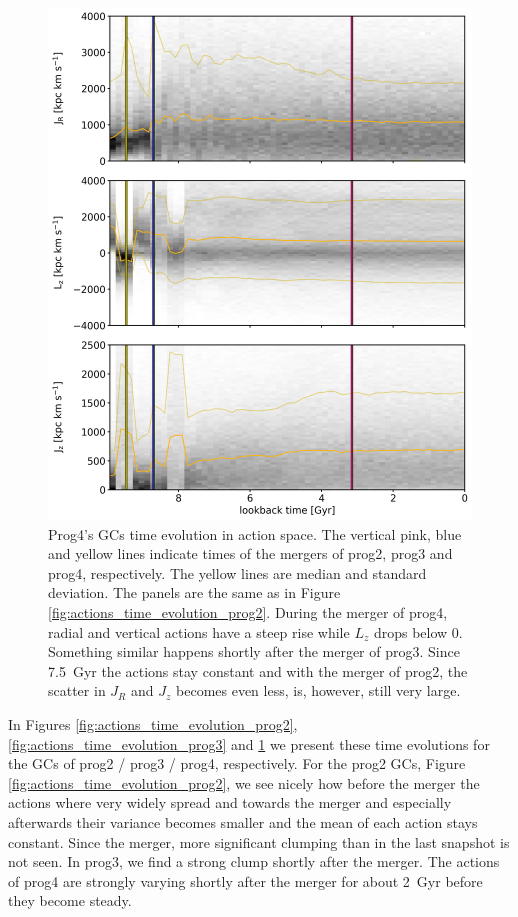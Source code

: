 \begin{figure}[htbp]
\captionsetup{format=plain}
    \centering
	\includegraphics[width=\textwidth]{plots/Dynamics/prog4/action_time_evolution_wodisk_hist_mean.png}
    \caption{Prog4's \acp{GC} time evolution in action space. The vertical pink, blue and yellow lines indicate times of the mergers of prog2, prog3 and prog4, respectively. The yellow lines are median and standard deviation. The panels are the same as in Figure \ref{fig:actions_time_evolution_prog2}. During the merger of prog4, radial and vertical actions have a steep rise while $L_z$ drops below 0. Something similar happens shortly after the merger of prog3. Since \SI{7.5}{Gyr} the actions stay constant and with the merger of prog2, the scatter in $J_R$ and $J_z$ becomes even less, is, however, still very large.}\label{fig:actions_time_evolution_prog4}
\end{figure}
In Figures \ref{fig:actions_time_evolution_prog2}, \ref{fig:actions_time_evolution_prog3} and \ref{fig:actions_time_evolution_prog4} we present these time evolutions for the \acp{GC} of prog2 / prog3 / prog4, respectively. For the prog2 \acp{GC}, Figure \ref{fig:actions_time_evolution_prog2}, we see nicely how before the merger the actions where very widely spread and towards the merger and especially afterwards their variance becomes smaller and the mean of each action stays constant. Since the merger, more significant clumping than in the last snapshot is not seen. In prog3, we find a strong clump shortly after the merger. The actions of prog4 are strongly varying shortly after the merger for about \SI{2}{Gyr} before they become steady.

